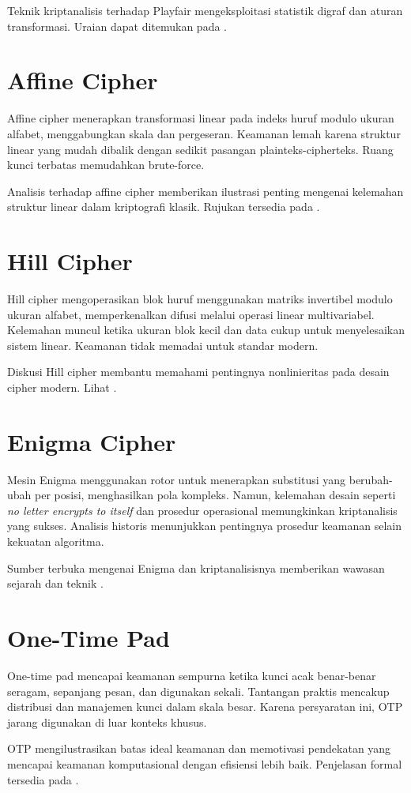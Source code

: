 \documentclass[../main.tex]{subfiles}
\begin{document}
Teknik kriptanalisis terhadap Playfair mengeksploitasi statistik digraf dan aturan transformasi. Uraian dapat ditemukan pada \textcite{menezes1996handbook}.

\section{Affine Cipher}
Affine cipher menerapkan transformasi linear pada indeks huruf modulo ukuran alfabet, menggabungkan skala dan pergeseran. Keamanan lemah karena struktur linear yang mudah dibalik dengan sedikit pasangan plainteks-cipherteks. Ruang kunci terbatas memudahkan brute-force.

Analisis terhadap affine cipher memberikan ilustrasi penting mengenai kelemahan struktur linear dalam kriptografi klasik. Rujukan tersedia pada \textcite{menezes1996handbook}.

\section{Hill Cipher}
Hill cipher mengoperasikan blok huruf menggunakan matriks invertibel modulo ukuran alfabet, memperkenalkan difusi melalui operasi linear multivariabel. Kelemahan muncul ketika ukuran blok kecil dan data cukup untuk menyelesaikan sistem linear. Keamanan tidak memadai untuk standar modern.

Diskusi Hill cipher membantu memahami pentingnya nonlinieritas pada desain cipher modern. Lihat \textcite{menezes1996handbook}.

\section{Enigma Cipher}
Mesin Enigma menggunakan rotor untuk menerapkan substitusi yang berubah-ubah per posisi, menghasilkan pola kompleks. Namun, kelemahan desain seperti \emph{no letter encrypts to itself} dan prosedur operasional memungkinkan kriptanalisis yang sukses. Analisis historis menunjukkan pentingnya prosedur keamanan selain kekuatan algoritma.

Sumber terbuka mengenai Enigma dan kriptanalisisnya memberikan wawasan sejarah dan teknik \parencite{menezes1996handbook}.

\section{One-Time Pad}
One-time pad mencapai keamanan sempurna ketika kunci acak benar-benar seragam, sepanjang pesan, dan digunakan sekali. Tantangan praktis mencakup distribusi dan manajemen kunci dalam skala besar. Karena persyaratan ini, OTP jarang digunakan di luar konteks khusus.

OTP mengilustrasikan batas ideal keamanan dan memotivasi pendekatan yang mencapai keamanan komputasional dengan efisiensi lebih baik. Penjelasan formal tersedia pada \textcite{menezes1996handbook}.
\end{document}
